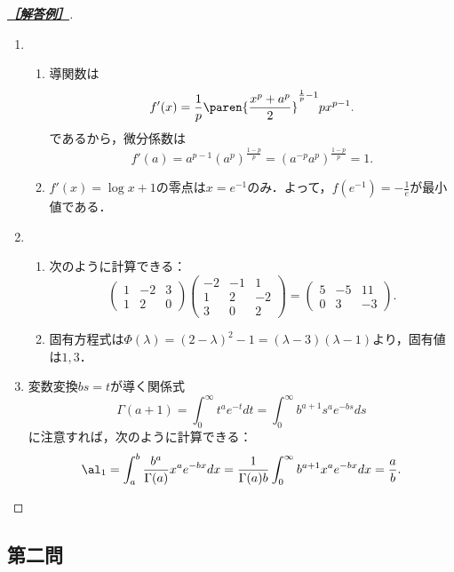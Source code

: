 \documentclass[uplatex,dvipdfmx]{jsarticle}
\begin{document}
\begin{proof}[\textbf{\underline{［解答例］}}]\mbox{}
    \begin{enumerate}
        \item 
        \begin{enumerate}
            \item 導関数は
            \[f'(x)=\frac{1}{p}\paren{\frac{x^p+a^p}{2}}^{\frac{1}{p}-1}px^{p-1}.\]
            であるから，微分係数は
            \[f'(a)=a^{p-1}(a^p)^{\frac{1-p}{p}}=(a^{-p}a^p)^{\frac{1-p}{p}}=1.\]
            \item $f'(x)=\log x+1$の零点は$x=e^{-1}$のみ．よって，$f(e^{-1})=-\frac{1}{e}$が最小値である．
        \end{enumerate}
        \item \begin{enumerate}
            \item 次のように計算できる：
            \[\begin{pmatrix}1&-2&3\\1&2&0\end{pmatrix}\begin{pmatrix}-2&-1&1\\1&2&-2\\3&0&2\end{pmatrix}=\begin{pmatrix}5&-5&11\\0&3&-3\end{pmatrix}.\]
            \item 固有方程式は$\Phi(\lambda)=(2-\lambda)^2-1=(\lambda-3)(\lambda-1)$より，固有値は$1,3$．
        \end{enumerate}
        \item 変数変換$bs=t$が導く関係式
        \[\Gamma(a+1)=\int^\infty_0t^ae^{-t}dt=\int^{\infty}_0b^{a+1}s^ae^{-bs}ds\]
        に注意すれば，次のように計算できる：
        \[\al_1=\int^b_a\frac{b^a}{\Gamma(a)}x^ae^{-bx}dx=\frac{1}{\Gamma(a)b}\int^\infty_0b^{a+1}x^ae^{-bx}dx=\frac{a}{b}.\]
    \end{enumerate}
\end{proof}

\subsection{第二問}
\end{document}

